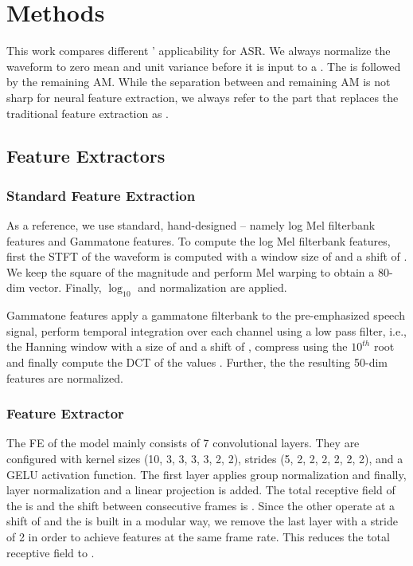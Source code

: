\documentclass{INTERSPEECH2023}
\begin{document}
\section{Methods}
This work compares different \fes' applicability for \gls{ASR}.
We always normalize the waveform to zero mean and unit variance before it is input to a \fe.
The \fe is followed by the remaining \gls{AM}.
While the separation between \fe and remaining \gls{AM} is not sharp for neural feature extraction, we always refer to the part that replaces the traditional feature extraction as \fe.

\subsection{Feature Extractors}
\subsubsection{Standard Feature Extraction}
As a reference, we use standard, hand-designed \fes -- namely log Mel filterbank features and Gammatone features.
To compute the log Mel filterbank features, first the \gls{STFT} of the waveform is computed with a window size of  and a shift of .
We keep the square of the magnitude and perform Mel warping to obtain a 80-dim vector.
Finally, $\log_{10}$ and normalization are applied.

Gammatone features apply a gammatone filterbank to the pre-emphasized speech signal, perform temporal integration over each channel using a low pass filter, i.e., the Hanning window with a size of  and a shift of , compress using the $10^{th}$ root and finally compute the \gls{DCT} of the values \cite{schlueter:icassp07}.
Further, the the resulting 50-dim features are normalized.

\subsubsection{\wvtwo Feature Extractor}
The \gls{FE} of the \wvtwo model \cite{facebook2020wav2vec2} mainly consists of 7 convolutional layers.
They are configured with kernel sizes (10, 3, 3, 3, 3, 2, 2), strides (5, 2, 2, 2, 2, 2, 2), and a GELU activation function.
The first layer applies group normalization and finally, layer normalization and a linear projection is added.
The total receptive field of the \wvtwo \fe is  and the shift between consecutive frames is .
Since the other \fes operate at a shift of  and the \wvtwo \fe is built in a modular way, we remove the last layer with a stride of 2 in order to achieve features at the same frame rate.
This reduces the total receptive field to .
\end{document}
